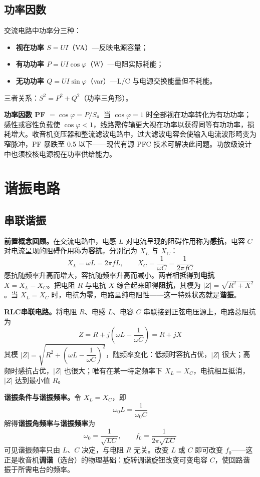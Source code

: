 \documentclass[12pt,UTF8]{ctexbook}
\begin{document}
\subsection{功率因数}

交流电路中功率分三种：
\begin{itemize}
  \item \textbf{视在功率 $S = UI$}（VA）—反映电源容量；
  \item \textbf{有功功率 $P = UI\cos\varphi$}（W）—电阻实际耗能；
  \item \textbf{无功功率 $Q = UI\sin\varphi$}（var）—L/C 与电源交换能量但不耗能。
\end{itemize}
三者关系：$S^2 = P^2 + Q^2$（功率三角形）。

\textbf{功率因数 PF} $= \cos\varphi = P/S$。当 $\cos\varphi = 1$ 时全部视在功率转化为有功功率；感性或容性负载使 $\cos\varphi < 1$，线路需传输更大视在功率以获得同等有功功率，损耗增大。收音机变压器和整流滤波电路中，过大滤波电容会使输入电流波形畸变为窄脉冲，PF 暴跌至 0.5 以下——现代有源 PFC 技术可解决此问题。功放级设计中也须校核电源视在功率供给能力。

\section{谐振电路}
\label{sec:resonance}

\subsection{串联谐振}

\textbf{前置概念回顾。}在交流电路中，电感 $L$ 对电流呈现的阻碍作用称为\textbf{感抗}，电容 $C$ 对电流呈现的阻碍作用称为\textbf{容抗}，分别记为 $X_L$ 与 $X_C$：
\[
X_L = \omega L = 2\pi f L, \qquad X_C = \frac{1}{\omega C} = \frac{1}{2\pi f C}
\]
感抗随频率升高而增大，容抗随频率升高而减小。两者相抵得到\textbf{电抗} $X = X_L - X_C$。把电阻 $R$ 与电抗 $X$ 综合起来即得\textbf{阻抗}，其模为 $|Z|=\sqrt{R^2+X^2}$。当 $X_L = X_C$ 时，电抗为零，电路呈纯电阻性——这一特殊状态就是\textbf{谐振}。

\textbf{RLC串联电路。}将电阻 $R$、电感 $L$、电容 $C$ 串联接到正弦电压源上，电路总阻抗为
\[
Z = R + j\!\left(\omega L - \frac{1}{\omega C}\right) = R + jX
\]
其模 $|Z|=\sqrt{R^2+\left(\omega L-\dfrac{1}{\omega C}\right)^2}$，随频率变化：低频时容抗占优，$|Z|$ 很大；高频时感抗占优，$|Z|$ 也很大；唯有在某一特定频率下 $X_L=X_C$，电抗相互抵消，$|Z|$ 达到最小值 $R$。

\textbf{谐振条件与谐振频率。}令 $X_L=X_C$，即
\[
\omega_0 L = \frac{1}{\omega_0 C}
\]
解得\textbf{谐振角频率}与\textbf{谐振频率}为
\[
\boxed{\;\omega_0 = \frac{1}{\sqrt{LC}}, \qquad f_0 = \frac{1}{2\pi\sqrt{LC}}\;}
\]
可见谐振频率只由 $L$、$C$ 决定，与电阻 $R$ 无关。改变 $L$ 或 $C$ 即可改变 $f_0$——这正是收音机\textbf{调谐}（选台）的物理基础：旋转调谐旋钮改变可变电容 $C$，使回路谐振于所需电台的频率。
\end{document}

